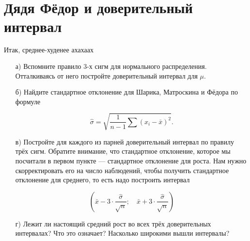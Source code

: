 \documentclass[12pt, a4paper, oneside]{article}
\begin{document}
\section{Дядя Фёдор и доверительный интервал}

Итак, среднее-худенее ахахаах


\begin{enumerate}
	
	\item[а)] Вспомните правило $3$-х сигм для нормального распределения. Отталкиваясь от него постройте доверительный интервал для $\mu$. 
	
	\item[б)] Найдите стандартное отклонение для Шарика, Матроскина и Фёдора по формуле 
	
	\[\hat \sigma = \sqrt{ \frac{1}{n-1}  \sum (x_i - \bar x)^2}.\]
	
	\item[в)] Постройте для каждого из парней доверительный интервал по правилу трёх сигм. Обратите внимание, что стандартное отклонение, которое мы посчитали в первом пункте --- стандартное отклонение для роста. Нам нужно скорректировать его на число наблюдений, чтобы получить стандартное отклонение для среднего, то есть надо построить интервал
	
	\[ \left( \bar x - 3 \cdot \frac{\hat \sigma}{\sqrt{n}}; \quad \bar x + 3 \cdot \frac{\hat \sigma}{\sqrt{n}} \right)\] 
	
	\item[г)] Лежит ли настоящий средний рост во всех трёх доверительных интервалах? Что это означает? Насколько широкими вышли интервалы? 
\end{enumerate}
\end{document}
